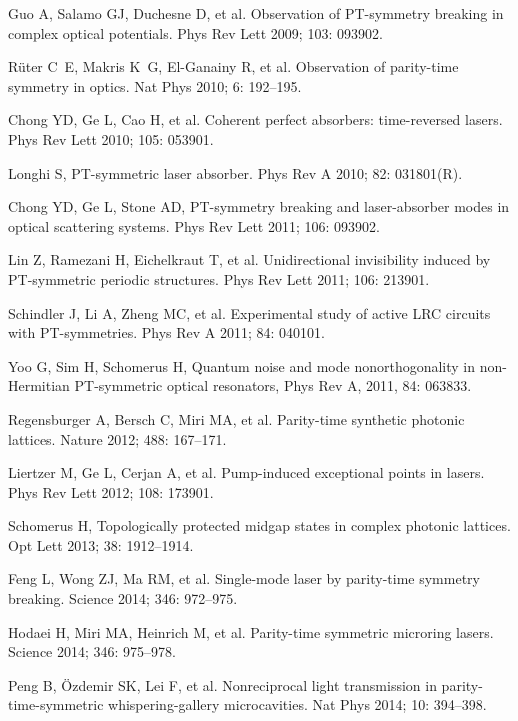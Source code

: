 \documentclass[12pt]{iopart}
\begin{document}
\begin{thebibliography}{100}
	 Guo A, Salamo GJ, Duchesne D, et al.
	Observation of  PT-symmetry breaking in complex optical potentials.
	Phys Rev Lett 2009;  103: 093902.
	
	 R\"uter C~E, Makris K~G, El-Ganainy R, et al.
	Observation of parity-time symmetry in optics.
	Nat Phys 2010;  6: 192--195.
	
	 Chong YD, Ge L, Cao H, et al.
	Coherent perfect absorbers: time-reversed lasers.
	Phys Rev Lett 2010;   105: 053901.
	
	 Longhi S,
	PT-symmetric laser absorber.
	Phys Rev A 2010;  82: 031801(R).
	
	 Chong YD, Ge L, Stone AD,
	 PT-symmetry breaking and laser-absorber modes in optical scattering systems.
	Phys Rev Lett 2011;  106: 093902.
	
	 Lin Z, Ramezani H, Eichelkraut T, et al.
	Unidirectional invisibility induced by  PT-symmetric periodic structures.
	Phys Rev Lett 2011;  106: 213901.
	
	 Schindler J, Li A, Zheng MC, et al.
	Experimental study of active LRC circuits with PT-symmetries.
	Phys Rev A 2011;  84: 040101.
	
	 Yoo G, Sim H, Schomerus H, Quantum noise and mode nonorthogonality in non-Hermitian PT-symmetric optical resonators, Phys Rev A, 2011,  84: 063833.
	
	 Regensburger A, Bersch C, Miri MA, et al.
	Parity-time synthetic photonic lattices.
	Nature 2012;  488: 167--171.
	
	 Liertzer M, Ge L, Cerjan A, et al.
	Pump-induced exceptional points in lasers.
	Phys Rev Lett 2012;   108: 173901.
	
	 Schomerus H,
	Topologically protected midgap states in complex photonic lattices.
	Opt Lett 2013;   38: 1912--1914.
	
	Feng L, Wong ZJ, Ma RM, et al.
	Single-mode laser by parity-time symmetry breaking.
	Science 2014;  346: 972--975.
	
	 Hodaei H, Miri MA, Heinrich M, et al.
	Parity-time symmetric microring lasers.
	Science 2014;  346: 975--978.
	
	 Peng B, \"Ozdemir SK, Lei F, et al.
	Nonreciprocal light transmission in parity-time-symmetric whispering-gallery microcavities.
	Nat  Phys 2014;  10: 394--398.
	

\end{thebibliography}
\end{document}
